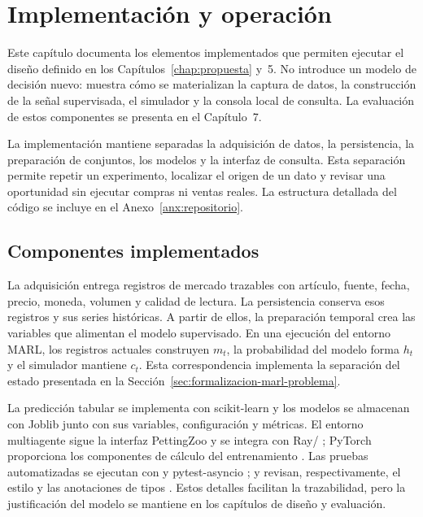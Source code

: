 \chapter{Implementación y operación}

\noindent Este capítulo documenta los elementos implementados que permiten ejecutar el diseño definido en los Capítulos~\ref{chap:propuesta} y~5. No introduce un modelo de decisión nuevo: muestra cómo se materializan la captura de datos, la construcción de la señal supervisada, el simulador y la consola local de consulta. La evaluación de estos componentes se presenta en el Capítulo~7.

La implementación mantiene separadas la adquisición de datos, la persistencia, la preparación de conjuntos, los modelos y la interfaz de consulta. Esta separación permite repetir un experimento, localizar el origen de un dato y revisar una oportunidad sin ejecutar compras ni ventas reales. La estructura detallada del código se incluye en el Anexo~\ref{anx:repositorio}.

\section{Componentes implementados}

La adquisición entrega registros de mercado trazables con artículo, fuente, fecha, precio, moneda, volumen y calidad de lectura. La persistencia conserva esos registros y sus series históricas. A partir de ellos, la preparación temporal crea las variables que alimentan el modelo supervisado. En una ejecución del entorno MARL, los registros actuales construyen $m_t$, la probabilidad del modelo forma $h_t$ y el simulador mantiene $c_t$. Esta correspondencia implementa la separación del estado presentada en la Sección~\ref{sec:formalizacion-marl-problema}.

La predicción tabular se implementa con scikit-learn \cite{pedregosa2011scikit} y los modelos se almacenan con Joblib junto con sus variables, configuración y métricas. El entorno multiagente sigue la interfaz PettingZoo \cite{terry2021pettingzoo} y se integra con Ray/ \cite{ray2018rllib}; PyTorch proporciona los componentes de cálculo del entrenamiento \cite{paszke2019pytorch}. Las pruebas automatizadas se ejecutan con  y pytest-asyncio \cite{pytestDocs};  y  revisan, respectivamente, el estilo y las anotaciones de tipos \cite{ruffDocs,mypyDocs}. Estos detalles facilitan la trazabilidad, pero la justificación del modelo se mantiene en los capítulos de diseño y evaluación.

